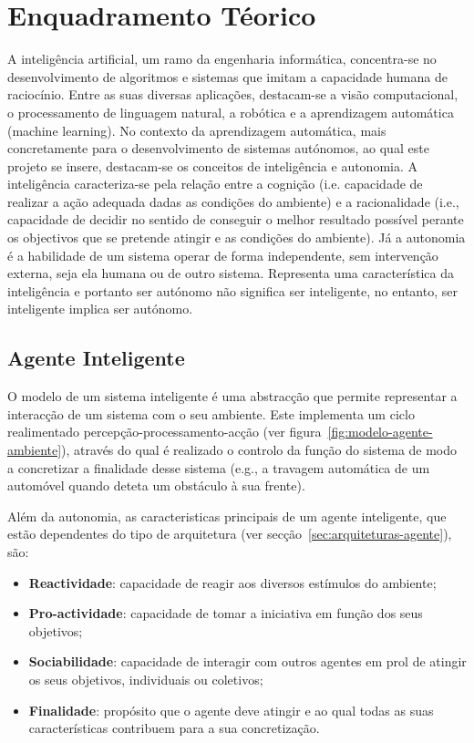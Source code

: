 \chapter{Enquadramento Téorico}\label{ch:enquadramento}

A inteligência artificial, um ramo da engenharia informática, concentra-se no desenvolvimento de algoritmos e sistemas que imitam a capacidade humana de raciocínio.
Entre as suas diversas aplicações, destacam-se a visão computacional, o processamento de linguagem natural, a robótica e a aprendizagem automática (machine learning).
No contexto da aprendizagem automática, mais concretamente para o desenvolvimento de sistemas autónomos, ao qual este projeto se insere, destacam-se os conceitos de inteligência e autonomia.
A inteligência caracteriza-se pela relação entre a cognição (i.e. capacidade de realizar a ação adequada dadas as condições do ambiente) e a racionalidade (i.e., capacidade de decidir no sentido de conseguir o melhor resultado possível perante os objectivos que se pretende atingir e as condições do ambiente).
Já a autonomia é a habilidade de um sistema operar de forma independente, sem intervenção externa, seja ela humana ou de outro sistema.
Representa uma característica da inteligência e portanto ser autónomo não significa ser inteligente, no entanto, ser inteligente implica ser autónomo.


\section{Agente Inteligente}
O modelo de um sistema inteligente é uma abstracção que permite representar a interacção de um sistema com o seu ambiente.
Este implementa um ciclo realimentado percepção-processamento-acção (ver figura~\ref{fig:modelo-agente-ambiente}), através do qual é realizado o controlo da função do sistema de modo a concretizar a finalidade desse sistema (e.g., a travagem automática de um automóvel quando deteta um obstáculo à sua frente).

Além da autonomia, as caracteristicas principais de um agente inteligente, que estão dependentes do tipo de arquitetura (ver secção~\ref{sec:arquiteturas-agente}), são:

\begin{itemize}
    \item \textbf{Reactividade}: capacidade de reagir aos diversos estímulos do ambiente;
    \item \textbf{Pro-actividade}: capacidade de tomar a iniciativa em função dos seus objetivos;
    \item \textbf{Sociabilidade}: capacidade de interagir com outros agentes em prol de atingir os seus objetivos, individuais ou coletivos;
    \item \textbf{Finalidade}: propósito que o agente deve atingir e ao qual todas as suas características contribuem para a sua concretização.
\end{itemize}

